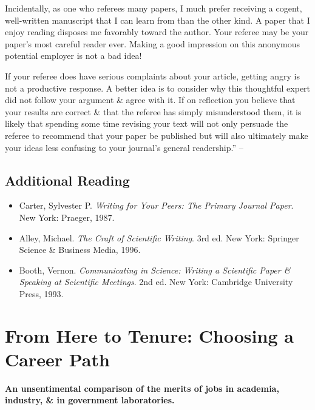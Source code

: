 \documentclass{article}
\numberwithin{equation}{section}
\begin{document}
Incidentally, as one who referees many papers, I much prefer receiving a cogent, well-written manuscript that I can learn from than the other kind. A paper that I enjoy reading disposes me favorably toward the author. Your referee may be your paper's most careful reader ever. Making a good impression on this anonymous potential employer is not a bad idea!

If your referee does have serious complaints about your article, getting angry is not a productive response. A better idea is to consider why this thoughtful expert did not follow your argument \& agree with it. If on reflection you believe that your results are correct \& that the referee has simply misunderstood them, it is likely that spending some time revising your text will not only persuade the referee to recommend that your paper be published but will also ultimately make your ideas less confusing to your journal's general readership.'' -- \cite[pp. 66--68]{Feibelman2011}

\subsection{Additional Reading}

\begin{itemize}
	\item Carter, Sylvester P. \textit{Writing for Your Peers: The Primary Journal Paper}. New York: Praeger, 1987.
	\item Alley, Michael. \textit{The Craft of Scientific Writing}. 3rd ed. New York: Springer Science \& Business Media, 1996.
	\item Booth, Vernon. \textit{Communicating in Science: Writing a Scientific Paper \& Speaking at Scientific Meetings}. 2nd ed. New York: Cambridge University Press, 1993.
\end{itemize}


\section{From Here to Tenure: Choosing a Career Path}

\begin{center}
	\textsf{\textbf{An unsentimental comparison of the merits of jobs in academia, industry, \& in government laboratories.}}
\end{center}

\end{document}
